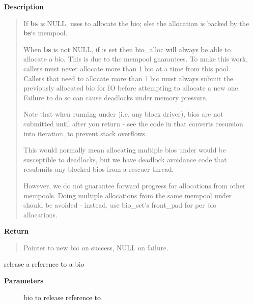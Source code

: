 \documentclass[a4paper,8pt,english]{sphinxmanual}
\begin{document}
\textbf{Description}
\begin{quote}

If \textbf{bs} is NULL, uses  to allocate the bio; else the allocation is
backed by the \textbf{bs}`s mempool.

When \textbf{bs} is not NULL, if  is set then bio\_alloc will
always be able to allocate a bio. This is due to the mempool guarantees.
To make this work, callers must never allocate more than 1 bio at a time
from this pool. Callers that need to allocate more than 1 bio must always
submit the previously allocated bio for IO before attempting to allocate
a new one. Failure to do so can cause deadlocks under memory pressure.

Note that when running under  (i.e. any block
driver), bios are not submitted until after you return - see the code in
 that converts recursion into iteration, to prevent
stack overflows.

This would normally mean allocating multiple bios under
 would be susceptible to deadlocks, but we have
deadlock avoidance code that resubmits any blocked bios from a rescuer
thread.

However, we do not guarantee forward progress for allocations from other
mempools. Doing multiple allocations from the same mempool under
 should be avoided - instead, use bio\_set's front\_pad
for per bio allocations.
\end{quote}

\textbf{Return}
\begin{quote}

Pointer to new bio on success, NULL on failure.
\end{quote}

\begin{fulllineitems}
\label{filesystems/index:c.bio_put}
release a reference to a bio

\end{fulllineitems}


\textbf{Parameters}
\begin{description}
\item[{}] \leavevmode
bio to release reference to

\end{description}
\end{document}
